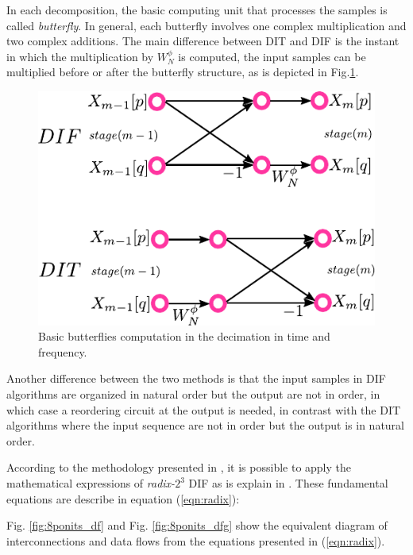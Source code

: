 \documentclass[journal,comsoc]{IEEEtran}
\begin{document}
In each decomposition, the basic computing unit that processes the samples is called \textit{butterfly}. In general, each butterfly involves one complex multiplication and two complex additions. The main difference between DIT and DIF is the instant in which the multiplication by $W_N^\phi$ is computed, the input samples can be multiplied before or after the butterfly structure, as is depicted in Fig.\ref{fig:difdit}.




\begin{figure} [ht!]
	\centering
	\includegraphics[width=0.65\linewidth]{Diagramas/miSeccionFiguras/DifDit.pdf}
	\caption{Basic butterflies computation in the decimation in time and frequency.}
	\label{fig:difdit}
\end{figure}

Another difference between the two methods is that the input samples in DIF algorithms are organized in natural order but the output are not in order, in which case a reordering circuit at the output is needed, in contrast with the DIT algorithms where the input sequence are not in order but the output is in natural order.

According to the methodology presented in \cite{proakis_digital_nodate}, it is possible to apply the mathematical expressions of \textit{radix-}$2^3$ DIF as is explain in \cite{jia_efficient_nodate}. These fundamental equations are describe in equation (\ref{eqn:radix}):

\begingroup
\allowdisplaybreaks
\begin{small}

\end{small}
\endgroup


Fig. \ref{fig:8ponits_df} and Fig. \ref{fig:8ponits_dfg} show the equivalent diagram of interconnections and data flows from the equations presented in (\ref{eqn:radix}).

\end{document}
